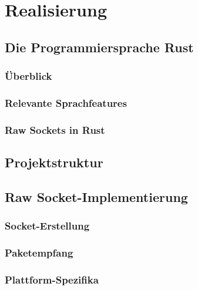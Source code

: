 
\chapter{Realisierung}
\label{chap:realisierung}

\section{Die Programmiersprache Rust}
\label{sec:rust}

\subsection{Überblick}
\label{subsec:rust-overview}

\subsection{Relevante Sprachfeatures}
\label{subsec:rust-features}

\subsection{Raw Sockets in Rust}
\label{subsec:rust-sockets}

\section{Projektstruktur}
\label{sec:projektstruktur}

\section{Raw Socket-Implementierung}
\label{sec:raw-socket}

\subsection{Socket-Erstellung}
\label{subsec:socket-erstellung}

\subsection{Paketempfang}
\label{subsec:paketempfang}

\subsection{Plattform-Spezifika}
\label{subsec:plattform}

